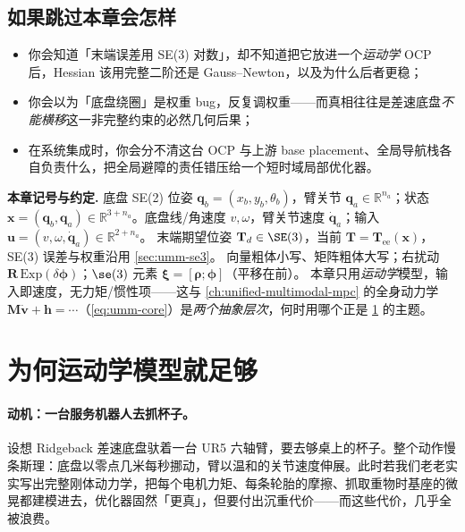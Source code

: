 \subsection*{如果跳过本章会怎样}
\begin{itemize}
  \item 你会知道「末端误差用 SE(3) 对数」，却不知道把它放进一个\emph{运动学} OCP 后，Hessian 该用完整二阶还是 Gauss--Newton，以及为什么后者更稳；
  \item 你会以为「底盘绕圈」是权重 bug，反复调权重——而真相往往是差速底盘\emph{不能横移}这一非完整约束的必然几何后果；
  \item 在系统集成时，你会分不清这台 OCP 与上游 base placement、全局导航栈各自负责什么，把全局避障的责任错压给一个短时域局部优化器。
\end{itemize}

\begin{note}
\textbf{本章记号与约定.}\;
底盘 SE(2) 位姿 $\mathbf q_b=(x_b,y_b,\theta_b)$，臂关节 $\mathbf q_a\in\mathbb R^{n_a}$；状态 $\mathbf x=(\mathbf q_b,\mathbf q_a)\in\mathbb R^{3+n_a}$。底盘线/角速度 $v,\omega$，臂关节速度 $\dot{\mathbf q}_a$；输入 $\mathbf u=(v,\omega,\dot{\mathbf q}_a)\in\mathbb R^{2+n_a}$。
末端期望位姿 $\mathbf T_d\in\SE(3)$，当前 $\mathbf T=\mathbf T_{\text{ee}}(\mathbf x)$，SE(3) 误差与权重沿用 \cref{sec:umm-se3}。
向量粗体小写、矩阵粗体大写；右扰动 $\mathbf R\,\mathrm{Exp}(\delta\boldsymbol\phi)$；$\se(3)$ 元素 $\boldsymbol\xi=[\boldsymbol\rho;\boldsymbol\phi]$（平移在前）。
本章只用\emph{运动学}模型，输入即速度，无力矩/惯性项——这与 \cref{ch:unified-multimodal-mpc} 的全身动力学 $\mathbf M\dot{\mathbf v}+\mathbf h=\cdots$（\cref{eq:umm-core}）是\emph{两个抽象层次}，何时用哪个正是 \cref{sec:mmocp-why} 的主题。
\end{note}

\section{为何运动学模型就足够}
\label{sec:mmocp-why}

\paragraph{动机：一台服务机器人去抓杯子。}
设想 Ridgeback 差速底盘驮着一台 UR5 六轴臂，要去够桌上的杯子。整个动作慢条斯理：底盘以零点几米每秒挪动，臂以温和的关节速度伸展。此时若我们老老实实写出完整刚体动力学，把每个电机力矩、每条轮胎的摩擦、抓取重物时基座的微晃都建模进去，优化器固然「更真」，但要付出沉重代价——而这些代价，几乎全被浪费。

